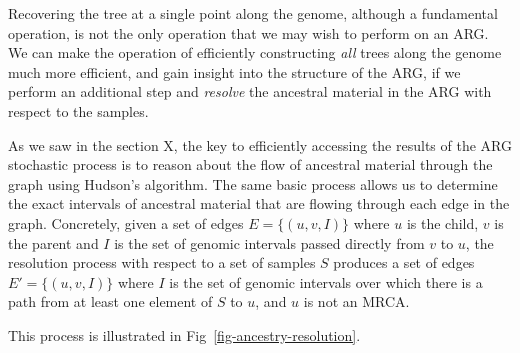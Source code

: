 \documentclass{article}
\begin{document}
Recovering the tree at a single point along the genome, although
a fundamental operation, is not the only operation that we may wish
to perform on an ARG. We can make the operation of efficiently
constructing \emph{all} trees along the genome much more efficient,
and gain insight into the structure of the ARG,
if we perform an additional step and \emph{resolve} the ancestral
material in the ARG with respect to the samples.

As we saw in the section X, the key to efficiently accessing the
results of the ARG stochastic process is to reason about
the flow of ancestral material through the graph using Hudson's
algorithm. The same basic process allows us to determine the
exact intervals of ancestral material that are flowing through
each edge in the graph. Concretely, given a set of edges
$E = \{(u, v, I)\}$ where $u$ is the child, $v$ is the parent
and $I$ is the set of genomic intervals passed directly from
$v$ to $u$, the resolution process with respect to a set of
samples $S$ produces a set of edges $E' = \{(u, v, I)\}$
where $I$ is the set of genomic intervals over which there is a
path from at least one element of $S$ to $u$,
and $u$ is not an MRCA.

This process is illustrated in Fig~\ref{fig-ancestry-resolution}.
\end{document}
